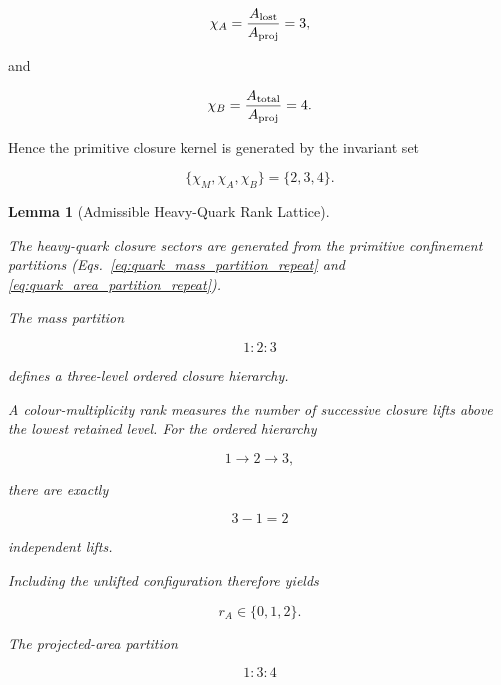 \documentclass[11pt]{article}
\newtheorem{lemma}[theorem]{Lemma}
\theoremstyle{definition}
\theoremstyle{remark}
\begin{document}
\begin{equation}
\chi_A
=
\frac{A_{\rm lost}}
     {A_{\rm proj}}
=
3,
\end{equation}

and

\begin{equation}
\chi_B
=
\frac{A_{\rm total}}
     {A_{\rm proj}}
=
4.
\end{equation}

Hence the primitive closure kernel is generated by the invariant
set

\begin{equation}
\{\chi_M,\chi_A,\chi_B\}
=
\{2,3,4\}.
\end{equation}

\begin{lemma}[Admissible Heavy-Quark Rank Lattice]
\label{lem:heavy_quark_rank_lattice}

The heavy-quark closure sectors are generated from the
primitive confinement partitions
(Eqs.~\eqref{eq:quark_mass_partition_repeat}
and \eqref{eq:quark_area_partition_repeat}).

The mass partition

\begin{equation}
1:2:3
\end{equation}

defines a three-level ordered closure hierarchy.

A colour-multiplicity rank measures the number of successive
closure lifts above the lowest retained level. For the ordered
hierarchy

\begin{equation}
1
\longrightarrow
2
\longrightarrow
3,
\end{equation}

there are exactly

\begin{equation}
3-1=2
\end{equation}

independent lifts.

Including the unlifted configuration therefore yields

\begin{equation}
r_A\in\{0,1,2\}.
\label{eq:rA_values}
\end{equation}

The projected-area partition

\begin{equation}
1:3:4
\end{equation}


\end{lemma}
\end{document}
